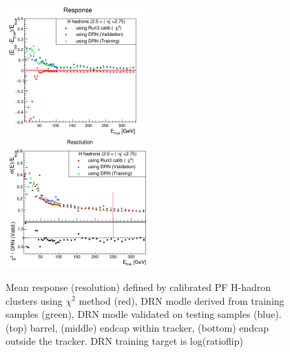 \begin{figure}
\includegraphics[width=0.495\textwidth]{./plots_pdf/HCAL_plots/Trained_target_ratioflip_0_500_10/pdf/H_ec_out/EC_outside_tracker_corrEtaEndcapHcal.png}
\includegraphics[width=0.495\textwidth]{./plots_pdf/HCAL_plots/Trained_target_ratioflip_0_500_10/pdf/H_ec_out/EC_outside_tracker_corrEtaEndcapHcal_reso.png}

\caption[ Response (resolution) vs \pt of the PF H-hadron cluster - traget log(ratioflip)]{Mean response (resolution) defined by calibrated PF H-hadron clusters using $\chi^{2}$ method (red), DRN modle derived from training samples (green), DRN modle validated on testing samples (blue). (top) barrel, (middle) endcap within tracker, (bottom) endcap outside the tracker. DRN training target is log(ratioflip)}
\label{fig:H_logratioflip}

\end{figure}
